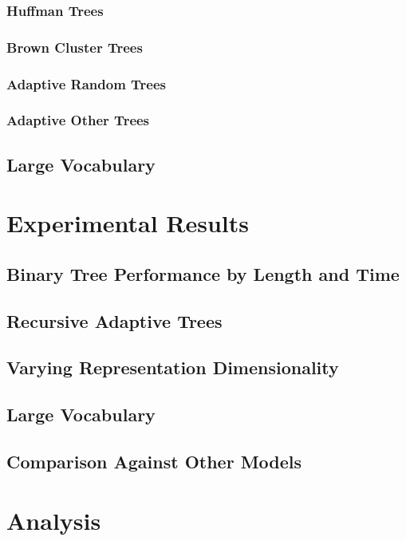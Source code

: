 \documentclass[12pt]{ociamthesis}  %
\begin{document}
\subsubsection{Huffman Trees}
\subsubsection{Brown Cluster Trees}
\subsubsection{Adaptive Random Trees}
\subsubsection{Adaptive Other Trees}

\subsection{Large Vocabulary}

\section{Experimental Results}
\subsection{Binary Tree Performance by Length and Time}
\subsection{Recursive Adaptive Trees}
\subsection{Varying Representation Dimensionality}
\subsection{Large Vocabulary}

\subsection{Comparison Against Other Models}

\section{Analysis}
\paragraph{}
\end{document}

